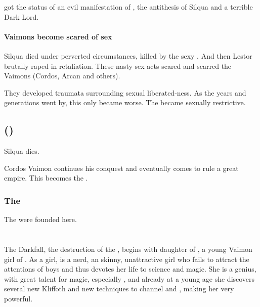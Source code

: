 \Delphine{} got the status of an evil manifestation of \itzach, the antithesis of Silqua and a terrible Dark Lord. 





\subsubsection{Vaimons become scared of sex}
Silqua died under perverted circumstances, killed by the sexy \Delphine. 
And then Lestor \Delaen brutally raped \Delphine{} in retaliation. 
These nasty sex acts scared and scarred the Vaimons (Cordos, Arcan and others). 

They developed traumata surrounding sexual liberated-ness. 
As the years and generations went by, this only became worse. 
The \VaimonCaliphate became sexually restrictive. 















\section{\Caliphate ()}
Silqua dies. 

Cordos Vaimon continues his conquest and eventually comes to rule a great empire. This becomes the \VaimonCaliphate. 









\subsection{The \vclans}
The  were founded here. 
























\chapter{\HundredScourgesBook}
The Darkfall, the destruction of the \VaimonCaliphate, begins with \Belzir{} daughter of \Cormin, a young Vaimon girl of \ClanGeican. As a girl, \Belzir{} is a nerd, an skinny, unattractive girl who fails to attract the attentions of boys and thus devotes her life to science and magic. She is a genius, with great talent for magic, especially \nieur{}, and already at a young age she discovers several new Kliffoth and new techniques to channel \iquin{} and \nieur{}, making her very powerful. 

